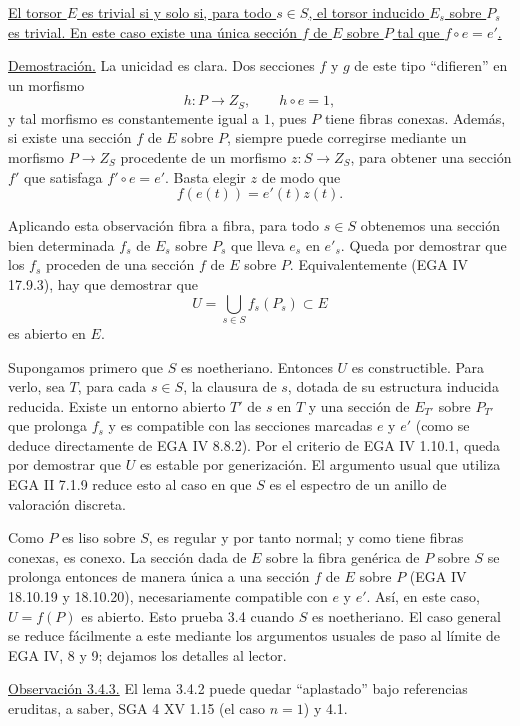 
\underline{El torsor $E$ es trivial si y solo si, para todo $s\in S$,
el torsor inducido $E_s$ sobre $P_s$ es trivial. En este caso existe
una única sección $f$ de $E$ sobre $P$ tal que $f\circ e=e'$.}

\noindent\underline{Demostración.} La unicidad es clara. Dos secciones
$f$ y $g$ de este tipo ``difieren'' en un morfismo
\[
 h:P\longrightarrow Z_S,
 \qquad h\circ e=1,
\]
y tal morfismo es constantemente igual a $1$, pues $P$ tiene fibras
conexas. Además, si existe una sección $f$ de $E$ sobre $P$, siempre
puede corregirse mediante un morfismo $P\longrightarrow Z_S$
procedente de un morfismo $z:S\longrightarrow Z_S$, para obtener una
sección $f'$ que satisfaga $f'\circ e=e'$. Basta elegir $z$ de modo que
\[
 f(e(t))=e'(t)z(t).
\]

Aplicando esta observación fibra a fibra, para todo $s\in S$ obtenemos
una sección bien determinada $f_s$ de $E_s$ sobre $P_s$ que lleva
$e_s$ en $e'_s$. Queda por demostrar que los $f_s$ proceden de una
sección $f$ de $E$ sobre $P$. Equivalentemente (EGA IV 17.9.3), hay
que demostrar que
\[
 U=\bigcup_{s\in S}f_s(P_s)\subset E
\]
es abierto en $E$.

Supongamos primero que $S$ es noetheriano. Entonces $U$ es
constructible. Para verlo, sea $T$, para cada $s\in S$, la clausura de
$s$, dotada de su estructura inducida reducida. Existe un entorno
abierto $T'$ de $s$ en $T$ y una sección de $E_{T'}$ sobre $P_{T'}$
que prolonga $f_s$ y es compatible con las secciones marcadas $e$ y
$e'$ (como se deduce directamente de EGA IV 8.8.2). Por el criterio de
EGA IV 1.10.1, queda por demostrar que $U$ es estable por
generización. El argumento usual que utiliza EGA II 7.1.9 reduce esto
al caso en que $S$ es el espectro de un anillo de valoración discreta.


Como $P$ es liso sobre $S$, es regular y por tanto normal; y como tiene
fibras conexas, es conexo. La sección dada de $E$ sobre la fibra
genérica de $P$ sobre $S$ se prolonga entonces de manera única a una
sección $f$ de $E$ sobre $P$ (EGA IV 18.10.19 y 18.10.20),
necesariamente compatible con $e$ y $e'$. Así, en este caso,
$U=f(P)$ es abierto. Esto prueba 3.4 cuando $S$ es noetheriano. El caso
general se reduce fácilmente a este mediante los argumentos usuales
de paso al límite de EGA IV, 8 y 9; dejamos los detalles al lector.

\medskip
\noindent\underline{Observación 3.4.3.} El lema 3.4.2 puede quedar
``aplastado'' bajo referencias eruditas, a saber, SGA 4 XV 1.15 (el
caso $n=1$) y 4.1.

